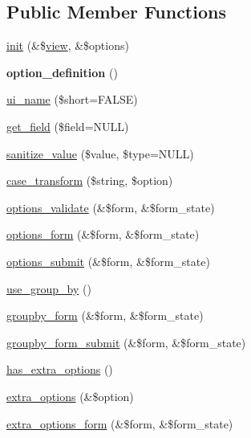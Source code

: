 \subsection*{Public Member Functions}
\begin{DoxyCompactItemize}
\item 
\hyperlink{classviews__handler_aa7df174ffa94ab095f7b9fdf154bcc30}{init} (\&\$\hyperlink{classview}{view}, \&\$options)
\item 
\hypertarget{classviews__handler_a4c7085e301e56ba46f6f8798c20ce9b1}{
{\bfseries option\_\-definition} ()}
\label{classviews__handler_a4c7085e301e56ba46f6f8798c20ce9b1}

\item 
\hyperlink{classviews__handler_ae81019ed08d9c3f5bca3d16c69e7b39f}{ui\_\-name} (\$short=FALSE)
\item 
\hyperlink{classviews__handler_ab21c92ac39f9eaf30b85bfe29833df2f}{get\_\-field} (\$field=NULL)
\item 
\hyperlink{classviews__handler_a0e347d00f1270832f88c46705901721e}{sanitize\_\-value} (\$value, \$type=NULL)
\item 
\hyperlink{classviews__handler_a49a14d85598b7f8d70a339e656ce9514}{case\_\-transform} (\$string, \$option)
\item 
\hyperlink{classviews__handler_a831c00b8cd3c667e25db014a3413273c}{options\_\-validate} (\&\$form, \&\$form\_\-state)
\item 
\hyperlink{classviews__handler_aa41fcf16b177eb03e35facbae6320f74}{options\_\-form} (\&\$form, \&\$form\_\-state)
\item 
\hyperlink{classviews__handler_abb55e97dbb1e634b95a1cc9ea836d6e8}{options\_\-submit} (\&\$form, \&\$form\_\-state)
\item 
\hyperlink{classviews__handler_a929fa734f0c231cb81f52889652e6aef}{use\_\-group\_\-by} ()
\item 
\hyperlink{classviews__handler_a22753b2a1aba15a7b0276fe8adb1dd8f}{groupby\_\-form} (\&\$form, \&\$form\_\-state)
\item 
\hyperlink{classviews__handler_a73b3d91e7c3ac0ccbe3541c518acf41f}{groupby\_\-form\_\-submit} (\&\$form, \&\$form\_\-state)
\item 
\hyperlink{classviews__handler_a10d35469346efc352d21e5f44de60b2e}{has\_\-extra\_\-options} ()
\item 
\hyperlink{classviews__handler_a0299b8b2ba70379a5aca4ddb5b8d95b4}{extra\_\-options} (\&\$option)
\item 
\hyperlink{classviews__handler_a0eed1d12c47d60190f59e135d962719e}{extra\_\-options\_\-form} (\&\$form, \&\$form\_\-state)

\end{DoxyCompactItemize}
